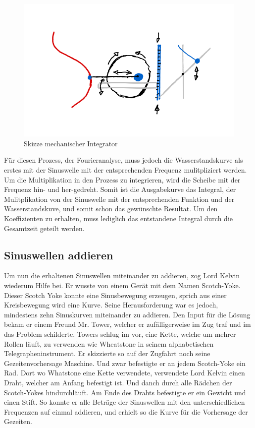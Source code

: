 \begin{figure}
	\centering
	\includegraphics[width=\linewidth]{"papers/gezeiten/Skizze Integralmaschine"}
	\caption{Skizze mechanischer Integrator}
	\label{fig:skizze-integralmaschine}
\end{figure}

Für diesen Prozess, der Fourieranalyse, muss jedoch die  Wasserstandskurve als erstes mit der Sinuswelle mit der entsprechenden Frequenz mulitpliziert werden.
Um die Multiplikation in den Prozess zu integrieren, wird die Scheibe mit der Frequenz hin- und her-gedreht.
Somit ist die Ausgabekurve das Integral, der Mulitplikation von der Sinuswelle mit der entsprechenden Funktion und der Wasserstandskuve, und somit schon das gewünschte Resultat.
Um den Koeffizienten zu erhalten, muss lediglich das entstandene Integral durch die Gesamtzeit geteilt werden.

\subsection{Sinuswellen addieren}

Um nun die erhaltenen Sinuswellen miteinander zu addieren, zog Lord Kelvin wiederum Hilfe bei.
Er wusste von einem Gerät mit dem Namen Scotch-Yoke.
Dieser Scotch Yoke konnte eine Sinusbewegung erzeugen, sprich aus einer Kreisbewegung wird eine Kurve.
Seine Herausforderung war es jedoch, mindestens zehn Sinuskurven miteinander zu addieren.
Den Input für die Lösung bekam er einem Freund Mr. Tower, welcher er zufälligerweise im Zug traf und im das Problem schilderte.
Towers schlug im vor, eine Kette, welche um mehrer Rollen läuft, zu verwenden wie Wheatstone in seinem alphabetischen Telegrapheninstrument.
Er skizzierte so auf der Zugfahrt noch seine Gezeitenvorhersage Maschine.
Und zwar befestigte er an jedem Scotch-Yoke ein Rad.
Dort wo Whatstone eine Kette verwendete, verwendete Lord Kelvin einen Draht, welcher am Anfang befestigt ist.
Und danch durch alle Rädchen der Scotch-Yokes hindurchläuft.
Am Ende des Drahts befestigte er ein Gewicht und einen Stift.
So konnte er alle Beträge der Sinuswellen mit den unterschiedlichen Frequenzen auf einmal addieren, und erhielt so die Kurve für die Vorhersage der Gezeiten.

